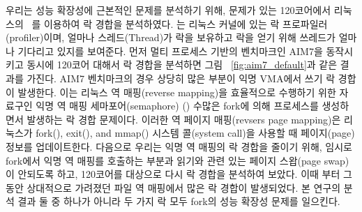 우리는 성능 확장성에 근본적인 문제를 분석하기 위해, 문제가 있는 120코어에서 리눅스의
 ~\cite{LOCKSTAT}를 이용하여 락 경합을 분석하였다.
 는 리눅스 커널에 있는 락 프로파일러(profiler)이며, 얼마나 스레드(Thread)가 락을 보유하고 
 락을 얻기 위해 쓰레드가 얼마나 기다리고 있지를 보여준다.
먼저 멀티 프로세스 기반의 벤치마크인 AIM7을 동작시키고 동시에 120코어 대해서 락 경합을 분석하면 
그림 ~\ref{fig:aim7_default}과 같은 결과를 가진다. 
AIM7 벤치마크의 경우 상당히 많은 부분이 익명 VMA에서 쓰기 락 경합이 발생한다. 
이는 리눅스 역 매핑(reverse mapping)을 효율적으로 수행하기 위한 자료구인 익명 역 매핑 세마포어(semaphore)
() 수많은 fork에 의해 프로세스를 생성하면서 발생하는 락 경합 문제이다.
이러한 역 페이지 매핑(revsers page mapping)은 리눅스가 fork(), exit(), and mmap() 시스템
콜(system call)을 사용할 때 페이지(page) 정보를 업데이트한다.
다음으로 우리는 익명 역 매핑의 락 경합을 줄이기 위해, 임시로 fork에서 익명 역 매핑를 호출하는 부분과 
읽기와 관련 있는 페이지 스왑(page swap)이 안되도록 하고, 120코어를 대상으로 다시 락 경합을 분석하여 보았다.
이때 부터 그동안 상대적으로 가려졌던 파일 역 매핑에서 많은 락 경합이 발생되었다.
본 연구의 분석 결과 둘 중 하나가 아니라 두 가지 락 모두 fork의 성능 확장성 문제를 일으킨다.

